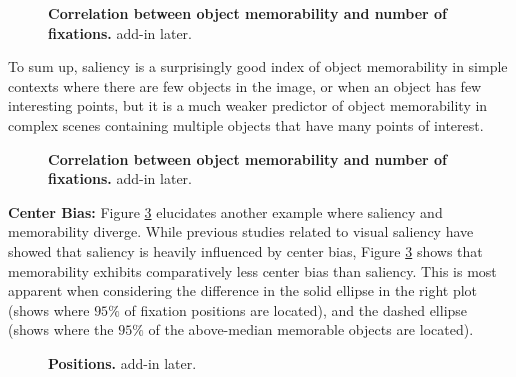 \begin{figure}[t]
\centering
{}
\vspace{-5mm}\caption{\footnotesize\textbf{Correlation between object memorability and number of fixations.} add-in later. }\label{fig:fixCorr}
\end{figure}

To sum up, saliency is a surprisingly good index of object memorability in simple contexts where there are few objects in the image, or when an object has few interesting points, but it is a much weaker predictor of object memorability in complex scenes containing multiple objects that have many points of interest.

\begin{figure}[b]
\centering
{}
\vspace{-5mm}\caption{\footnotesize\textbf{Correlation between object memorability and number of fixations.} add-in later. }\label{fig:scatterFixation}
\end{figure}

\textbf{Center Bias: } Figure \ref{fig:fixPos} elucidates another example where saliency and memorability diverge. While previous studies related to visual saliency have showed that saliency is heavily influenced by center bias, Figure \ref{fig:fixPos} shows that memorability exhibits comparatively less center bias than saliency. This is most apparent when considering the difference in the solid ellipse in the right plot (shows where $95\%$ of fixation positions are located), and the dashed ellipse (shows where the $95\%$ of the above-median memorable objects are located).

\begin{figure}[t]
\centering
{}
\vspace{-5mm}\caption{\footnotesize\textbf{Positions.} add-in later. }\label{fig:fixPos}
\end{figure}


